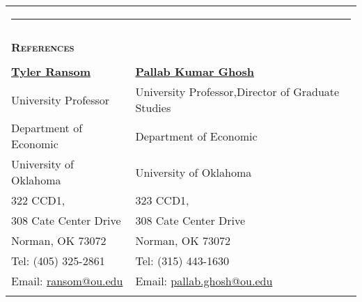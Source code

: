 \documentclass[10pt,letterpaper]{article}
\begin{document}






\begin{tabular}{p{4.25 in}p{3.75in}}
	\multicolumn{2}{p{7.5in}}{\hrule}\\
	\\
	{\large \textsc{\textbf{\large{References}}}} &\\
	\\
	\href{https://tyleransom.github.io/}{\textbf{Tyler Ransom}}                      & \href{https://sites.google.com/site/pallabghoshou/}{\textbf{Pallab Kumar Ghosh}} \\
	University Professor                                                                              & University Professor,Director of Graduate Studies \\
	Department of Economic                                                             & Department of Economic  \\
	University of Oklahoma                                                                    & University of Oklahoma \\
	322 CCD1,                                                                                   & 323 CCD1, \\
	308 Cate Center Drive                                                                              & 308 Cate Center Drive  \\
	Norman, OK 73072                                                                              & Norman, OK 73072   \\
	Tel: (405) 325-2861                                                                          & Tel: (315) 443-1630 \\
	Email: \href{ransom@ou.edu}{ransom@ou.edu}                        & Email: \href{pallab.ghosh@ou.edu}{pallab.ghosh@ou.edu}  \\ \\
	
	
	

\end{tabular}
\end{document}
